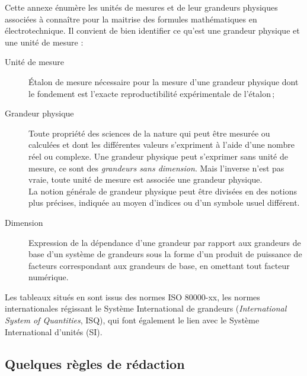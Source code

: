 Cette annexe énumère les unités de mesures et de leur grandeurs physiques associées à connaître pour la maitrise des formules mathématiques en électrotechnique. Il convient de bien identifier ce qu'est une grandeur physique et une unité de mesure :
\begin{description}
\item[Unité de mesure] \'Etalon de mesure nécessaire pour la mesure d'une grandeur physique dont le fondement est l'exacte reproductibilité expérimentale de l'étalon\,;
\item[Grandeur physique] Toute propriété des sciences de la nature qui peut être mesurée ou calculées et dont les différentes valeurs s'expriment à l'aide d'une nombre réel ou complexe. Une grandeur physique peut s'exprimer sans unité de mesure, ce sont des \emph{grandeurs sans dimension}. Mais l'inverse n'est pas vraie, toute unité de mesure est associée une grandeur physique.\\
La notion générale de grandeur physique peut être divisées en des notions plus précises, indiquée au moyen d'indices ou d'un symbole usuel différent.
\item[Dimension] Expression de la dépendance d'une grandeur par rapport aux grandeurs de base d'un système de grandeurs sous la forme d'un produit de puissance de facteurs correspondant aux grandeurs de base, en omettant tout facteur numérique.
\end{description}
Les tableaux situés en  sont issus des normes ISO 80000-xx\cite{ISO:80000-2013}, les normes internationales régissant le Système International de grandeurs (\emph{International System of Quantities}, ISQ), qui font également le lien avec le Système International d'unités (SI).

\subsection{Quelques règles de rédaction}


